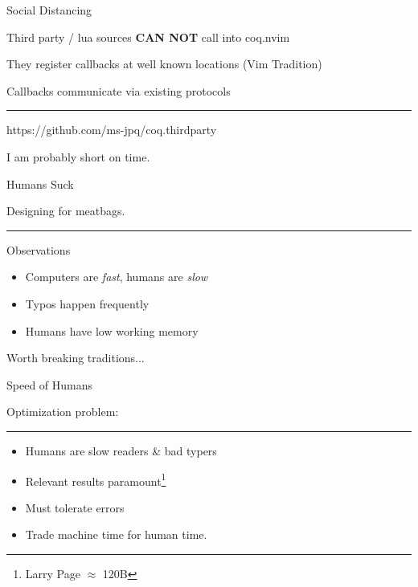 \documentclass{beamer}
\begin{document}
\begin{frame}{Social Distancing}

	Third party / lua sources \textbf{CAN NOT} call into coq.nvim

	They register callbacks at well known locations (Vim Tradition)

	Callbacks communicate via existing protocols

	\rule{\textwidth}{0.1em}

	https://github.com/ms-jpq/coq.thirdparty

\end{frame}


\begin{frame}[standout]

	I am probably short on time.

\end{frame}


\begin{frame}{Humans Suck}

	Designing for meatbags.

	\rule{\textwidth}{0.1em}

	\begin{block}{Observations}

		\begin{itemize}

			\item Computers are \textit{fast}, humans are \textit{slow}

			\item Typos happen frequently

			\item Humans have low working memory

		\end{itemize}

	\end{block}

	Worth breaking traditions...

\end{frame}


\begin{frame}{Speed of Humans}

	Optimization problem:

	\rule{\textwidth}{0.1em}

	\begin{itemize}

		\item Humans are slow readers \& bad typers

		\item Relevant results paramount\footnote{Larry Page $\approx$ 120B}

		\item Must tolerate errors

		\item Trade machine time for human time.

	\end{itemize}

\end{frame}
\end{document}
